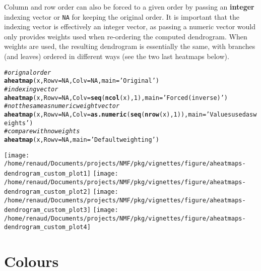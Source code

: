 \documentclass[a4paper]{article}\usepackage[]{graphicx}\usepackage[]{color}
\makeatletter
\newcommand{\hlnum}[1]{\textcolor[rgb]{0.686,0.059,0.569}{#1}}%
\newcommand{\hlstr}[1]{\textcolor[rgb]{0.192,0.494,0.8}{#1}}%
\newcommand{\hlcom}[1]{\textcolor[rgb]{0.678,0.584,0.686}{\textit{#1}}}%
\newcommand{\hlstd}[1]{\textcolor[rgb]{0.345,0.345,0.345}{#1}}%
\newcommand{\hlkwc}[1]{\textcolor[rgb]{0.333,0.667,0.333}{#1}}%
\newcommand{\hlkwd}[1]{\textcolor[rgb]{0.737,0.353,0.396}{\textbf{#1}}}%
\newenvironment{kframe}{%
 \def\at@end@of@kframe{}%
 \ifinner\ifhmode%
  \def\at@end@of@kframe{\end{minipage}}%
  \begin{minipage}{\columnwidth}%
 \fi\fi%
 \def\FrameCommand##1{\hskip\@totalleftmargin \hskip-\fboxsep
 \colorbox{shadecolor}{##1}\hskip-\fboxsep
     \hskip-\linewidth \hskip-\@totalleftmargin \hskip\columnwidth}%
 \MakeFramed {\advance\hsize-\width
   \@totalleftmargin\z@ \linewidth\hsize
   \@setminipage}}%
 {\par\unskip\endMakeFramed%
 \at@end@of@kframe}
\newenvironment{knitrout}{}{} %
\let\code=\texttt
\makeatother
\begin{document}
Column and row order can also be forced to a given order by passing an
\textbf{integer} indexing vector or \code{NA} for keeping the original order.
It is important that the indexing vector is effectively an integer
vector, as passing a numeric vector would only provides weights used
when re-ordering the computed dendrogram.
When weights are used, the resulting dendrogram is essentially the same, with
branches (and leaves) ordered in different ways (see the two last heatmaps
below).

\begin{knitrout}\small
{}\color{fgcolor}\begin{kframe}
\begin{alltt}
\hlcom{# orignal order}
\hlkwd{aheatmap}\hlstd{(x,} \hlkwc{Rowv} \hlstd{=} \hlnum{NA}\hlstd{,} \hlkwc{Colv} \hlstd{=} \hlnum{NA}\hlstd{,} \hlkwc{main} \hlstd{=} \hlstr{'Original'}\hlstd{)}
\hlcom{# indexing vector}
\hlkwd{aheatmap}\hlstd{(x,} \hlkwc{Rowv} \hlstd{=} \hlnum{NA}\hlstd{,} \hlkwc{Colv} \hlstd{=} \hlkwd{seq}\hlstd{(}\hlkwd{ncol}\hlstd{(x),} \hlnum{1}\hlstd{),} \hlkwc{main} \hlstd{=} \hlstr{'Forced (inverse)'}\hlstd{)}
\hlcom{# not the same as numeric weight vector}
\hlkwd{aheatmap}\hlstd{(x,} \hlkwc{Rowv} \hlstd{=} \hlnum{NA}\hlstd{,} \hlkwc{Colv} \hlstd{=} \hlkwd{as.numeric}\hlstd{(}\hlkwd{seq}\hlstd{(}\hlkwd{nrow}\hlstd{(x),} \hlnum{1}\hlstd{)),} \hlkwc{main} \hlstd{=} \hlstr{'Values used as weights'}\hlstd{)}
\hlcom{# compare with no weights}
\hlkwd{aheatmap}\hlstd{(x,} \hlkwc{Rowv} \hlstd{=} \hlnum{NA}\hlstd{,} \hlkwc{main} \hlstd{=} \hlstr{'Default weighting'}\hlstd{)}
\end{alltt}
\end{kframe}
\texttt{[image: /home/renaud/Documents/projects/NMF/pkg/vignettes/figure/aheatmaps-dendrogram\_custom\_plot1]} 
\texttt{[image: /home/renaud/Documents/projects/NMF/pkg/vignettes/figure/aheatmaps-dendrogram\_custom\_plot2]} 
\texttt{[image: /home/renaud/Documents/projects/NMF/pkg/vignettes/figure/aheatmaps-dendrogram\_custom\_plot3]} 
\texttt{[image: /home/renaud/Documents/projects/NMF/pkg/vignettes/figure/aheatmaps-dendrogram\_custom\_plot4]} 

\end{knitrout}

\section{Colours}
\end{document}
